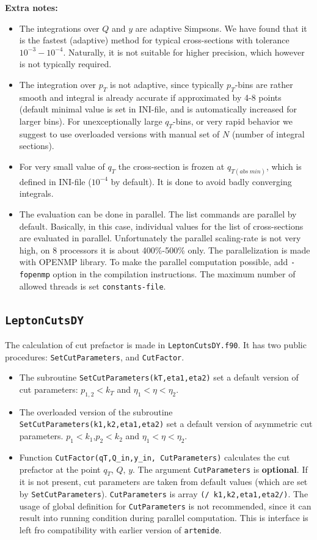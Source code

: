 \documentclass[prd,nofootinbib,eqsecnum,final]{revtex4}
\renewcommand{\(}{\left(}
\renewcommand{\)}{\right)}
\renewcommand{\[}{\left[}
\renewcommand{\]}{\right]}
\begin{document}
\textbf{Extra notes:}
\begin{itemize}
\item The integrations over $Q$ and $y$ are adaptive Simpsons. We have found that it is the fastest (adaptive) method for typical cross-sections with tolerance $10^{-3}-10^{-4}$. Naturally, it is not suitable for higher precision, which however is not typically required.
\item The integration over $p_T$ is not adaptive, since typically $p_T$-bins are rather smooth and integral is already accurate if approximated by 4-8 points (default minimal value is set in INI-file, and is automatically increased for larger bins). For unexceptionally large $q_T$-bins, or very rapid behavior we suggest to use overloaded versions with manual set of $N$ (number of integral sections).
\item For very small value of $q_T$ the cross-section is frozen at $q_{T(abs~min)}$, which is defined in INI-file ($10^{-4}$ by default). It is done to avoid badly converging integrals.
\item The evaluation can be done in parallel. The list commands are parallel by default. Basically, in this case, individual values for the list of cross-sections are evaluated in parallel. Unfortunately the parallel scaling-rate is not very high, on 8 processors it is about 400\%-500\% only. The parallelization is made with OPENMP library. To make the parallel computation possible, add \texttt{-fopenmp} option in the compilation instructions. The maximum number of allowed threads is set \texttt{constants-file}.
\end{itemize}


\subsection{\texttt{LeptonCutsDY}}

The calculation of cut prefactor is made in \texttt{LeptonCutsDY.f90}. It has two public procedures: \texttt{SetCutParameters}, and \texttt{CutFactor}. 
\begin{itemize}
\item The subroutine \texttt{SetCutParameters(kT,eta1,eta2)} set a default version of cut parameters: $p_{1,2}<k_T$ and $\eta_1<\eta<\eta_2$.
\item The overloaded version of the subroutine \texttt{SetCutParameters(k1,k2,eta1,eta2)} set a default version of asymmetric cut parameters. $p_{1}<k_1$,$p_2<k_2$ and $\eta_1<\eta<\eta_2$.
\item Function \texttt{CutFactor(qT,Q\_in,y\_in, CutParameters)} calculates the cut prefactor at the point $q_T$, $Q$, $y$. The argument \texttt{CutParameters} is \textbf{optional}. If it is not present, cut parameters are taken from default values (which are set by \texttt{SetCutParameters}). \texttt{CutParameters} is array \texttt{(/ k1,k2,eta1,eta2/)}. The usage of global definition for \texttt{CutParameters} is not recommended, since it can result into running condition during parallel computation. This is interface is left fro compatibility with earlier version of \texttt{artemide}.
\end{itemize} 
\end{document}
